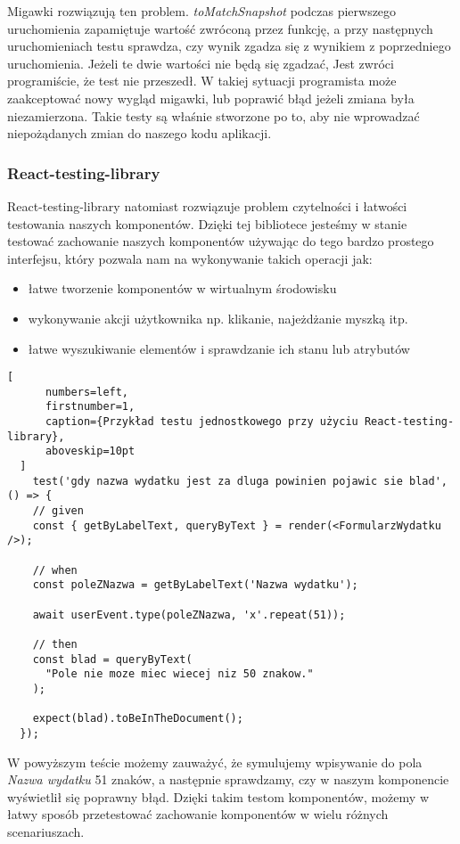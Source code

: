 \begin{description}
  Migawki rozwiązują ten problem. \emph{toMatchSnapshot} podczas pierwszego uruchomienia zapamiętuje wartość zwróconą przez funkcję, a przy następnych uruchomieniach testu sprawdza, czy wynik zgadza się z wynikiem z poprzedniego uruchomienia. Jeżeli te dwie wartości nie będą się zgadzać, Jest zwróci programiście, że test nie przeszedł. W takiej sytuacji programista może zaakceptować nowy wygląd migawki, lub poprawić błąd jeżeli zmiana była niezamierzona. Takie testy są właśnie stworzone po to, aby nie wprowadzać niepożądanych zmian do naszego kodu aplikacji.

\subsubsection{React-testing-library} React-testing-library natomiast rozwiązuje problem czytelności i łatwości testowania naszych komponentów. Dzięki tej bibliotece jesteśmy w stanie testować zachowanie naszych komponentów używając do tego bardzo prostego interfejsu, który pozwala nam na wykonywanie takich operacji jak:
\begin{itemize}
  \item łatwe tworzenie komponentów w wirtualnym środowisku
  \item wykonywanie akcji użytkownika np. klikanie, najeżdżanie myszką itp.
  \item łatwe wyszukiwanie elementów i sprawdzanie ich stanu lub atrybutów
\end{itemize}


\end{description}
  \begin{addmargin}[6mm]{0mm}
  \begin{lstlisting}[
      numbers=left,
      firstnumber=1,
      caption={Przykład testu jednostkowego przy użyciu React-testing-library},
      aboveskip=10pt
  ]
    test('gdy nazwa wydatku jest za dluga powinien pojawic sie blad', () => {
    // given
    const { getByLabelText, queryByText } = render(<FormularzWydatku />);

    // when
    const poleZNazwa = getByLabelText('Nazwa wydatku');

    await userEvent.type(poleZNazwa, 'x'.repeat(51));

    // then
    const blad = queryByText(
      "Pole nie moze miec wiecej niz 50 znakow."
    );

    expect(blad).toBeInTheDocument();
  });
  \end{lstlisting}
  \end{addmargin}
  W powyższym teście możemy zauważyć, że symulujemy wpisywanie do pola \emph{Nazwa wydatku} 51 znaków, a następnie sprawdzamy, czy w naszym komponencie wyświetlił się poprawny błąd. Dzięki takim testom komponentów, możemy w łatwy sposób przetestować zachowanie komponentów w wielu różnych scenariuszach.

